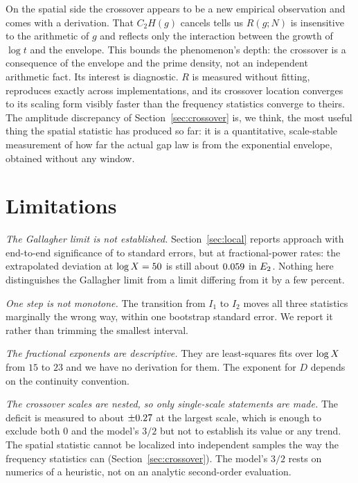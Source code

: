 \documentclass[11pt,a4paper]{article}
\begin{document}
On the spatial side the crossover appears to be a new empirical observation and comes with a derivation. That $C_2H(g)$ cancels tells us $R(g;N)$ is insensitive to the arithmetic of $g$ and reflects only the interaction between the growth of $\log t$ and the envelope. This bounds the phenomenon's depth: the crossover is a consequence of the envelope and the prime density, not an independent arithmetic fact. Its interest is diagnostic. $R$ is measured without fitting, reproduces exactly across implementations, and its crossover location converges to its scaling form visibly faster than the frequency statistics converge to theirs. The amplitude discrepancy of Section~\ref{sec:crossover} is, we think, the most useful thing the spatial statistic has produced so far: it is a quantitative, scale-stable measurement of how far the actual gap law is from the exponential envelope, obtained without any window.

\section{Limitations}

\emph{The Gallagher limit is not established.} Section~\ref{sec:local} reports approach with end-to-end significance of \zDEnd{} to \zEtwoEnd{} standard errors, but at fractional-power rates: the extrapolated deviation at $\log X=50$ is still about $0.059$ in $E_2$. Nothing here distinguishes the Gallagher limit from a limit differing from it by a few percent.

\emph{One step is not monotone.} The transition from $I_1$ to $I_2$ moves all three statistics marginally the wrong way, within one bootstrap standard error. We report it rather than trimming the smallest interval.

\emph{The fractional exponents are descriptive.} They are least-squares fits over $\log X$ from $15$ to $23$ and we have no derivation for them. The exponent for $D$ depends on the continuity convention.

\emph{The crossover scales are nested, so only single-scale statements are made.} The deficit is measured to about $\pm0.27$ at the largest scale, which is enough to exclude both $0$ and the model's $3/2$ but not to establish its value or any trend. The spatial statistic cannot be localized into independent samples the way the frequency statistics can (Section~\ref{sec:crossover}). The model's $3/2$ rests on numerics of a heuristic, not on an analytic second-order evaluation.
\end{document}

